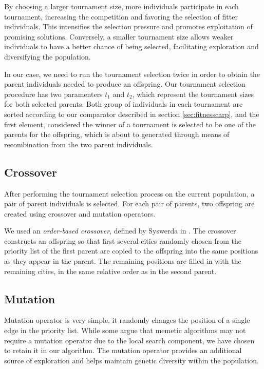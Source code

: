 \documentclass[twoside]{ctuthesis}
\theoremstyle{plain}
\theoremstyle{definition}
\theoremstyle{note}
\begin{document}
By choosing a larger tournament size, more individuals participate in each tournament, increasing the competition and favoring the selection of fitter individuals. This intensifies the selection pressure and promotes exploitation of promising solutions. Conversely, a smaller tournament size allows weaker individuals to have a better chance of being selected, facilitating exploration and diversifying the population.

In our case, we need to run the tournament selection twice in order to obtain the parent individuals needed to produce an offspring. Our tournament selection procedure has two paramenters \emph{$t_1$} and \emph{$t_2$}, which represent the tournament sizes for both selected parents. Both group of individuals in each tournament are sorted according to our comparator described in section \ref{sec:fitnesscarp}, and the first element, considered the winner of a tournament is selected to be one of the parents for the offspring, which is about to generated through means of recombination from the two parent individuals.

\subsection{Crossover}
After performing the tournament selection process on the current population, a pair of parent individuals is selected. For each pair of parents, two offspring are created using crossover and mutation operators. 

We used an \emph{order-based crossover}, defined by Syswerda in \cite{syswerda1991schedule}. The crossover constructs an offspring so that first several cities randomly chosen from the priority list of the first parent are copied to the offspring into the same positions as they appear in the parent. The remaining positions are filled in with the remaining cities, in the same relative order as in the second parent.

\subsection{Mutation}
Mutation operator is very simple, it randomly changes the position of a single edge in the priority list. While some argue that memetic algorithms may not require a mutation operator due to the local search component, we have chosen to retain it in our algorithm. The mutation operator provides an additional source of exploration and helps maintain genetic diversity within the population.
\end{document}

